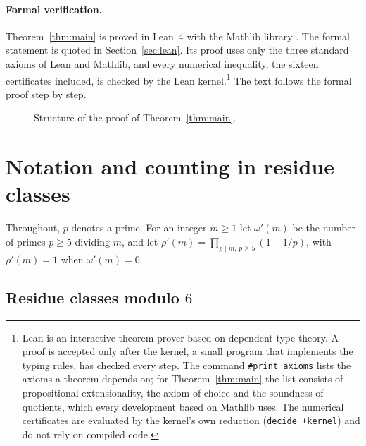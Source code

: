 \documentclass[11pt,a4paper]{article}
\theoremstyle{definition}
\theoremstyle{remark}
\begin{document}
\paragraph{Formal verification.} Theorem~\ref{thm:main} is proved in Lean~4 with the Mathlib library
\cite{Lean4,Mathlib}. The formal statement is quoted in Section~\ref{sec:lean}. Its proof uses only
the three standard axioms of Lean and Mathlib, and every numerical inequality, the sixteen
certificates included, is checked by the Lean kernel.\footnote{Lean is an interactive theorem prover
based on dependent type theory. A proof is accepted only after the kernel, a small program that
implements the typing rules, has checked every step. The command \texttt{\#print axioms} lists the
axioms a theorem depends on; for Theorem~\ref{thm:main} the list consists of propositional
extensionality, the axiom of choice and the soundness of quotients, which every development based on
Mathlib uses. The numerical certificates are evaluated by the kernel's own reduction
(\texttt{decide +kernel}) and do not rely on compiled code.} The text follows the formal proof step
by step.

\begin{figure}[t]
\centering

\caption{Structure of the proof of Theorem~\ref{thm:main}.}
\label{fig:flow}
\end{figure}

\section{Notation and counting in residue classes}\label{sec:prelim}

Throughout, $p$ denotes a prime. For an integer $m\ge1$ let $\omega'(m)$ be the number of primes
$p\ge5$ dividing $m$, and let $\rho'(m)=\prod_{p\mid m,\,p\ge5}(1-1/p)$, with $\rho'(m)=1$ when
$\omega'(m)=0$.

\subsection{\texorpdfstring{Residue classes modulo $6$}{Residue classes modulo 6}}
\end{document}
